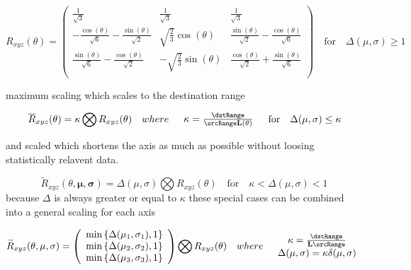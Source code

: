 \begin{equation}\label{eq:Rotation}
 R_{xyz}(\theta) = \left(
\begin{array}{ccc}
 \frac{1}{\sqrt{3}} & \frac{1}{\sqrt{3}} & \frac{1}{\sqrt{3}} \\
 -\frac{\cos (\theta )}{\sqrt{6}}-\frac{\sin (\theta )}{\sqrt{2}} &
 \sqrt{\frac{2}{3}} \cos (\theta ) &
 \frac{\sin (\theta )}{\sqrt{2}}-\frac{\cos (\theta )}{\sqrt{6}} \\
 \frac{\sin (\theta )}{\sqrt{6}}-\frac{\cos (\theta )}{\sqrt{2}} &
 -\sqrt{\frac{2}{3}} \sin (\theta ) &
 \frac{\cos (\theta )}{\sqrt{2}}+\frac{\sin (\theta )}{\sqrt{6}} \\
\end{array}
\right) \quad \text{for} \quad  \Delta(\mu,\sigma) \ge 1
\end{equation}

maximum scaling which scales to the destination range


\begin{equation}\label{eq:NormRxyz2}
 \overline{R}_{xyz}(\theta) =
\kappa
\bigotimes
R_{xyz}(\theta) \quad where \quad
\begin{array}{c}
\kappa = \frac{\dstRange }{\srcRange \mathbf{L}(\theta)}
\end{array} \quad \text{for} \quad    \Delta(\mu,\sigma) \le \kappa
\end{equation}

 and scaled which shortens the axis as much as possible without loosing statistically relavent data. 

\begin{equation}\label{eq:CompressedRotation}
 \widetilde{R}_{xyz}(\theta,\mathbf{\mu},\mathbf{\sigma}) =
\Delta(\mu,\sigma)
\bigotimes
R_{xyz}(\theta) \quad \text{for} \quad  \kappa < \Delta(\mu,\sigma) < 1
\end{equation}
because $\Delta$ is always greater or equal to $\kappa$ these special cases can be combined into a general scaling for each axis

\begin{equation}\label{eq:CombinedRotation}
 \widetilde{R}_{xyz}(\theta,\mu,\sigma) =
\left(
\begin{array}{c}
\min\left\{\Delta(\mu_1,\sigma_1), 1 \right\} \\
\min\left\{\Delta(\mu_2,\sigma_2), 1 \right\}  \\
\min\left\{\Delta(\mu_3,\sigma_3), 1 \right\}  \\
\end{array}
\right)
\bigotimes
R_{xyz}(\theta) \quad where \quad
\begin{array}{c}
\kappa = \frac{\dstRange }{\mathbf{L} \srcRange} \\
\Delta(\mu,\sigma) = \kappa \delta(\mu,\sigma)
\end{array}
\end{equation}

